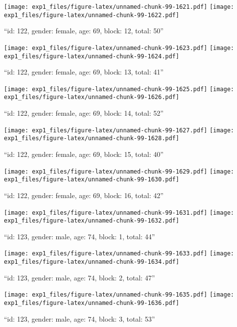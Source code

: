 \documentclass[,]{article}
\begin{document}
\texttt{[image: exp1\_files/figure-latex/unnamed-chunk-99-1621.pdf]}
\texttt{[image: exp1\_files/figure-latex/unnamed-chunk-99-1622.pdf]}

\newpage
[1] 

``id: 122, gender: female, age: 69, block: 12, total: 50''

\texttt{[image: exp1\_files/figure-latex/unnamed-chunk-99-1623.pdf]}
\texttt{[image: exp1\_files/figure-latex/unnamed-chunk-99-1624.pdf]}

\newpage
[1] 

``id: 122, gender: female, age: 69, block: 13, total: 41''

\texttt{[image: exp1\_files/figure-latex/unnamed-chunk-99-1625.pdf]}
\texttt{[image: exp1\_files/figure-latex/unnamed-chunk-99-1626.pdf]}

\newpage
[1] 

``id: 122, gender: female, age: 69, block: 14, total: 52''

\texttt{[image: exp1\_files/figure-latex/unnamed-chunk-99-1627.pdf]}
\texttt{[image: exp1\_files/figure-latex/unnamed-chunk-99-1628.pdf]}

\newpage
[1] 

``id: 122, gender: female, age: 69, block: 15, total: 40''

\texttt{[image: exp1\_files/figure-latex/unnamed-chunk-99-1629.pdf]}
\texttt{[image: exp1\_files/figure-latex/unnamed-chunk-99-1630.pdf]}

\newpage
[1] 

``id: 122, gender: female, age: 69, block: 16, total: 42''

\texttt{[image: exp1\_files/figure-latex/unnamed-chunk-99-1631.pdf]}
\texttt{[image: exp1\_files/figure-latex/unnamed-chunk-99-1632.pdf]}

\newpage
[1] 

``id: 123, gender: male, age: 74, block: 1, total: 44''

\texttt{[image: exp1\_files/figure-latex/unnamed-chunk-99-1633.pdf]}
\texttt{[image: exp1\_files/figure-latex/unnamed-chunk-99-1634.pdf]}

\newpage
[1] 

``id: 123, gender: male, age: 74, block: 2, total: 47''

\texttt{[image: exp1\_files/figure-latex/unnamed-chunk-99-1635.pdf]}
\texttt{[image: exp1\_files/figure-latex/unnamed-chunk-99-1636.pdf]}

\newpage
[1] 

``id: 123, gender: male, age: 74, block: 3, total: 53''
\end{document}
